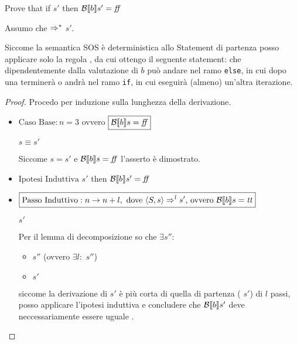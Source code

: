          {
           Prove that if  \Rar{*} $s'$ then $\mathcal{B} \llbracket b \rrbracket s' = \mbox{\textit{ff}}$
         }
         {
           Assumo che  $\Rightarrow^{*}$ $s'$.

           Siccome la semantica SOS è deterministica allo Statement di
           partenza posso applicare solo la regola \whileSOS, da cui ottengo
           il seguente statement:
           che dipendentemente dalla valutazione di $b$ può andare nel ramo
           \texttt{else}, in cui dopo una \skipForFriends{} terminerà o andrà nel ramo
           \texttt{if}, in cui eseguirà (almeno) un'altra iterazione.

           \begin{proof}
                        Procedo per induzione sulla lunghezza della derivazione.

           \begin{itemize}
             \item $\boxed{\text{Caso Base}: n = 3}$ ovvero 
           $\boxed{\mathcal{B} \llbracket b \rrbracket s = \mbox{\textit{ff}}}$ 
           
            \Rar{\whileSOS}
           \Rar{\ifffSOS}  
           \Rar{\skipSOS} $s \equiv s'$

           Siccome $s = s'$ e $\mathcal{B} \llbracket b \rrbracket s = \mbox{\textit{ff}}$ l'asserto è dimostrato.

           \item $\boxed{\text{Ipotesi Induttiva}} $  \Rar{*} $s'$ then $\mathcal{B} \llbracket b \rrbracket s' = \mbox{\textit{ff}}$

           \item $\boxed{\text{Passo Induttivo}: n \rightarrow n + l,
             \text{ dove } \langle{}S, s\rangle{} \Rightarrow^{l} s' \text{, ovvero } \mathcal{B} \llbracket b \rrbracket s = \mbox{\textit{tt}}}$

              \Rar{\whileSOS}  
             \Rar{\ifttSOS}  \Rar{*} $s'$

             Per il lemma di decomposizione so che $\exists s''$:
             \begin{itemize}
             \item {} \Rar{*} $s''$ (ovvero $\exists l:$
                 $s''$)
             \item {} \Rar{*} $s'$
             \end{itemize}
             siccome la derivazione di  \Rar{*} $s'$ è più
             corta di quella di partenza ( \Rar{*} $s'$)
             di $l$ passi, posso applicare l'ipotesi
             induttiva e concludere che $\mathcal{B} \llbracket b \rrbracket s'$ deve neccessariamente essere
             uguale \semfalse.
             
            \end{itemize} 
           \end{proof}
         }
